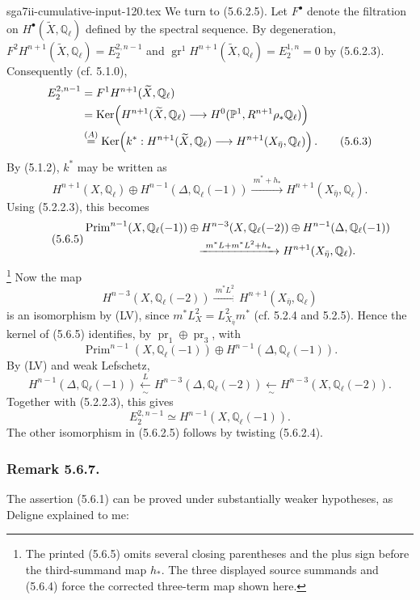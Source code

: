 \begin{filecontents*}{sga7ii-cumulative-input-120.tex}
We turn to (5.6.2.5).  Let $F^\bullet$ denote the filtration on
$H^\bullet(\widetilde X,\mathbb Q_\ell)$ defined by the spectral sequence.
By degeneration,
$F^2H^{n+1}(\widetilde X,\mathbb Q_\ell)=E_2^{2,n-1}$ and
$\operatorname{gr}^1H^{n+1}(\widetilde X,\mathbb Q_\ell)=E_2^{1,n}=0$
by (5.6.2.3).  Consequently (cf. 5.1.0),
\begin{align}
E_2^{2,n-1}
 &=F^1H^{n+1}(\widetilde X,\mathbb Q_\ell) \notag\\
 &=\operatorname{Ker}\!\left(
 H^{n+1}(\widetilde X,\mathbb Q_\ell)
 \longrightarrow H^0(\mathbb P^1,R^{n+1}\rho_*\mathbb Q_\ell)
 \right) \notag\\
 &\overset{(A)}{=}
 \operatorname{Ker}\!\left(
 k^*:H^{n+1}(\widetilde X,\mathbb Q_\ell)
 \longrightarrow H^{n+1}(X_{\bar\eta},\mathbb Q_\ell)
 \right).
\tag{5.6.3}
\end{align}
By (5.1.2), $k^*$ may be written as
\begin{equation}\tag{5.6.4}
H^{n+1}(X,\mathbb Q_\ell)
\oplus H^{n-1}(\Delta,\mathbb Q_\ell(-1))
\xrightarrow{\ m^*+h_*\ }
H^{n+1}(X_{\bar\eta},\mathbb Q_\ell).
\end{equation}
Using (5.2.2.3), this becomes
\begin{equation}\tag{5.6.5}
\begin{split}
&\operatorname{Prim}^{n-1}(X,\mathbb Q_\ell(-1))
\oplus H^{n-3}(X,\mathbb Q_\ell(-2))
\oplus H^{n-1}(\Delta,\mathbb Q_\ell(-1))\\
&\hspace{35mm}\xrightarrow{\ m^*L+m^*L^2+h_*\ }
H^{n+1}(X_{\bar\eta},\mathbb Q_\ell).
\end{split}
\end{equation}
\footnote{The printed (5.6.5) omits several closing parentheses and the plus
sign before the third-summand map $h_*$.  The three displayed source
summands and (5.6.4) force the corrected three-term map shown here.}
Now the map
\[
H^{n-3}(X,\mathbb Q_\ell(-2))
\xrightarrow{\ m^*L^2\ }
H^{n+1}(X_{\bar\eta},\mathbb Q_\ell)
\]
is an isomorphism by (LV), since
$m^*L_X^2=L_{X_{\bar\eta}}^2m^*$ (cf. 5.2.4 and 5.2.5).  Hence the kernel
of (5.6.5) identifies, by $\operatorname{pr}_1\oplus\operatorname{pr}_3$,
with
\[
\operatorname{Prim}^{n-1}(X,\mathbb Q_\ell(-1))
\oplus H^{n-1}(\Delta,\mathbb Q_\ell(-1)).
\]
By (LV) and weak Lefschetz,
\[
H^{n-1}(\Delta,\mathbb Q_\ell(-1))
\xleftarrow[\sim]{\,L\,}
H^{n-3}(\Delta,\mathbb Q_\ell(-2))
\xleftarrow[\sim]{\ }
H^{n-3}(X,\mathbb Q_\ell(-2)).
\]
Together with (5.2.2.3), this gives
\begin{equation}\tag{5.6.6}
E_2^{2,n-1}\simeq H^{n-1}(X,\mathbb Q_\ell(-1)).
\end{equation}
The other isomorphism in (5.6.2.5) follows by twisting (5.6.2.4).

\subsubsection*{Remark 5.6.7.}
The assertion (5.6.1) can be proved under substantially weaker hypotheses,
as Deligne explained to me:
\end{filecontents*}
